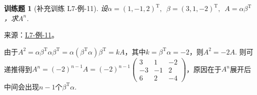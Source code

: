 \documentclass[12pt,fontset=fandol]{ctexart}
\newtheorem{exercise}{训练题}[section]
\begin{document}
\begin{exercise}[补充训练 L7-例-11]\label{prob:L7-例-11}
设$\alpha=(1,-1,2)^\mathrm{T},\enspace\beta=(3,1,-2)^\mathrm{T},\enspace A=\alpha\beta^\mathrm{T}$，求$A^n$.
\end{exercise}
\noindent 来源：\href{https://github.com/yhwu-is/Linear-Algebra-Left-Undone/blob/new/%E8%AE%B2%E4%B9%89/%E4%B8%93%E9%A2%98/7%20%E7%BA%BF%E6%80%A7%E6%98%A0%E5%B0%84%E7%9F%A9%E9%98%B5%E8%A1%A8%E7%A4%BA%E4%B8%8E%E7%9F%A9%E9%98%B5%E8%BF%90%E7%AE%97%E5%9F%BA%E7%A1%80.tex}{L7-例-11}。
\begin{solve}
由于$A^2=\alpha\beta^\mathrm{T}\alpha\beta^\mathrm{T}=\alpha(\beta^\mathrm{T}\alpha)\beta^\mathrm{T}=kA$，其中$k=\beta^\mathrm{T}\alpha=-2$，则$A^2=-2A$. 则可递推得到$A^n=(-2)^{n-1}A=(-2)^{n-1}\begin{pmatrix}
            3 & 1 & -2 \\ -3 & -1 & 2 \\ 6 & 2 & -4
        \end{pmatrix}$，原因在于$A^n$展开后中间会出现$n-1$个$\beta^\mathrm{T}\alpha$.
\end{solve}
\end{document}
